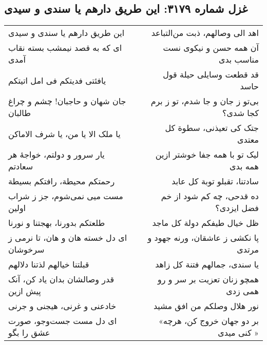 \begin{center}
\section*{غزل شماره ۳۱۷۹: این طریق دارهم یا سندی و سیدی}
\label{sec:3179}
\begin{longtable}{l p{0.5cm} r}
این طریق دارهم یا سندی و سیدی
&&
اهد الی وصالهم، ذبت من‌التباعد
\\
ای که به قصد نیمشب بسته نقاب آمدی
&&
آن همه حسن و نیکوی نست مناسب بدی
\\
یافئتی فدیتکم فی امل اتیتکم
&&
قد قطعت وسایلی حیلة قول حاسد
\\
جان شهان و حاجبان! چشم و چراغ طالبان
&&
بی‌تو ز جان و جا شدم، تو ز برم کجا شدی؟
\\
یا ملک الا یا من، یا شرف الاماکن
&&
جتک کی تعیذنی، سطوة کل معتدی
\\
یار سرور و دولتم، خواجهٔ هر سعادتم
&&
لیک تو با همه جفا خوشتر ازین همه بدی
\\
رحمتکم محیطة، رافتکم بسیطة
&&
سادتنا، تقبلو توبة کل عابد
\\
مست میی نمی‌شوم، جز ز شراب اولین
&&
ده قدحی، چه کم شود از خم فضل ایزدی؟
\\
طلعتکم بدورنا، بهجتنا و نورنا
&&
ظل خیال طیفکم دولة کل ماجد
\\
ای دل خسته هان و هان، تا نرمی ز سرخوشان
&&
پا نکشی ز عاشقان، ورنه جهود و مرتدی
\\
قبلتنا خیالهم لذتنا دلالهم
&&
یا سندی، جمالهم فتنة کل زاهد
\\
قدر وصالشان بدان یاد کن، آنک پیش ازین
&&
همچو زنان تعزیت بر سر و رو همی زدی
\\
خادعنی و غرنی، هیجنی و جرنی
&&
نور هلال وصلکم من افق مشید
\\
ای دل مست جست‌وجو، صورت عشق را بگو
&&
«بر دو جهان خروج کن، هرچه کنی میدی »
\\
\end{longtable}
\end{center}
